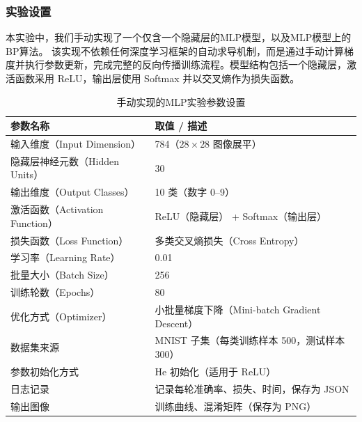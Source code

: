 \documentclass[12pt,a4paper]{article}
\begin{document}
\subsubsection{实验设置}
本实验中，我们手动实现了一个仅含一个隐藏层的MLP模型，以及MLP模型上的BP算法。
该实现不依赖任何深度学习框架的自动求导机制，而是通过手动计算梯度并执行参数更新，完成完整的反向传播训练流程。模型结构包括一个隐藏层，激活函数采用 ReLU，输出层使用 Softmax 并以交叉熵作为损失函数。
\begin{table}[H]
\centering
\caption{手动实现的MLP实验参数设置}
\label{tab:manual_mlp_config}
\begin{tabular}{ll}
\toprule
\textbf{参数名称} & \textbf{取值 / 描述} \\
\midrule
输入维度（Input Dimension） & 784（$28 \times 28$ 图像展平） \\
隐藏层神经元数（Hidden Units） & 30 \\
输出维度（Output Classes） & 10 类（数字 0--9） \\
激活函数（Activation Function） & ReLU（隐藏层） + Softmax（输出层） \\
损失函数（Loss Function） & 多类交叉熵损失（Cross Entropy） \\
学习率（Learning Rate） & 0.01 \\
批量大小（Batch Size） & 256 \\
训练轮数（Epochs） & 80 \\
优化方式（Optimizer） & 小批量梯度下降（Mini-batch Gradient Descent） \\
数据集来源 & MNIST 子集（每类训练样本 500，测试样本 300） \\
参数初始化方式 & He 初始化（适用于 ReLU） \\
日志记录 & 记录每轮准确率、损失、时间，保存为 JSON \\
输出图像 & 训练曲线、混淆矩阵（保存为 PNG） \\
\bottomrule
\end{tabular}
\end{table}
\end{document}
